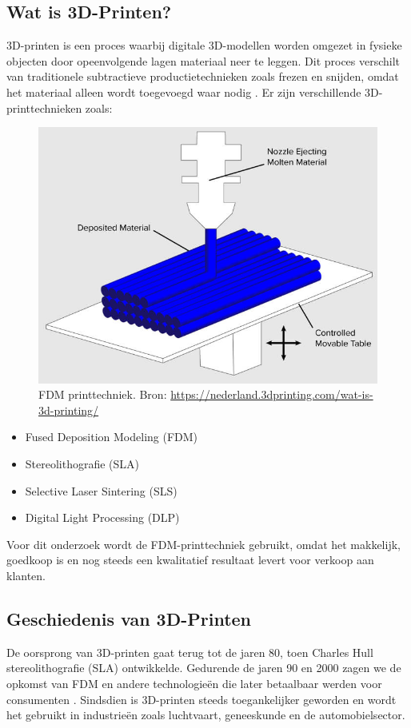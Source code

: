 \subsection{Wat is 3D-Printen?}
3D-printen is een proces waarbij digitale 3D-modellen worden omgezet in fysieke objecten door opeenvolgende lagen materiaal neer te leggen. Dit proces verschilt van traditionele subtractieve productietechnieken zoals frezen en snijden, omdat het materiaal alleen wordt toegevoegd waar nodig \autocite{3dPrintingIndustry}. Er zijn verschillende 3D-printtechnieken zoals:
\\
\begin{figure} %
    \centering
    \includegraphics[width=0.8\linewidth]{Foto's/FDM}
    \caption{FDM printtechniek. Bron: \url{https://nederland.3dprinting.com/wat-is-3d-printing/}}
    \label{fig:fdm}
\end{figure}
\begin{itemize}
    \item Fused Deposition Modeling (FDM)
    \item Stereolithografie (SLA)
    \item Selective Laser Sintering (SLS)
    \item Digital Light Processing (DLP)
\end{itemize}
Voor dit onderzoek wordt de FDM-printtechniek gebruikt, omdat het makkelijk, goedkoop is en nog steeds een kwalitatief resultaat levert voor verkoop aan klanten.

\subsection{Geschiedenis van 3D-Printen}
De oorsprong van 3D-printen gaat terug tot de jaren 80, toen Charles Hull stereolithografie (SLA) ontwikkelde. Gedurende de jaren 90 en 2000 zagen we de opkomst van FDM en andere technologieën die later betaalbaar werden voor consumenten \autocite{3dPrintingIndustry}. Sindsdien is 3D-printen steeds toegankelijker geworden en wordt het gebruikt in industrieën zoals luchtvaart, geneeskunde en de automobielsector.


